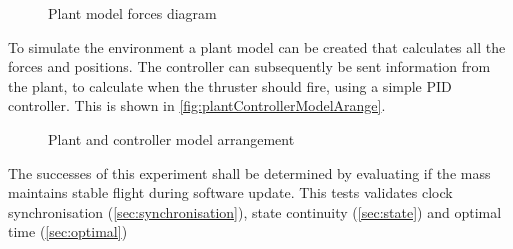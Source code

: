 \begin{figure}[ht]
    \centering
    \caption[Plant model forces diagram]
    {Plant model forces diagram}
    \label{fig:plantModelForcesDiagram}
\end{figure}

To simulate the environment a plant model can be created that calculates all the forces and positions. The controller can subsequently be sent information from the plant, to calculate when the thruster should fire, using a simple PID controller. This is shown in \autoref{fig:plantControllerModelArange}.

\begin{figure}[ht]
    \centering
    \caption[Plant and controller model arrangement]
    {Plant and controller model arrangement}
    \label{fig:plantControllerModelArange}
\end{figure}

The successes of this experiment shall be determined by evaluating if the mass maintains stable flight during software update. This tests validates clock synchronisation (\ref{sec:synchronisation}), state continuity (\ref{sec:state}) and optimal time (\ref{sec:optimal})